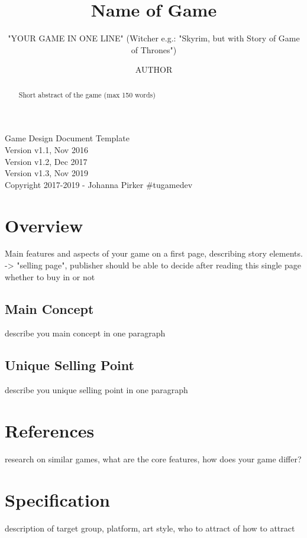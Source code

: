 \documentclass[a4paper]{scrreprt}
\title{Name of Game}
\subtitle{"YOUR GAME IN ONE LINE" (Witcher e.g.: "Skyrim, but with Story of Game of Thrones")}
\author{AUTHOR}
\begin{document}
\maketitle

\null\vfill
\noindent
Game Design Document Template\\ 
Version v1.1, Nov 2016\\
Version v1.2, Dec 2017\\
Version v1.3, Nov 2019\\
Copyright 2017-2019 - Johanna Pirker \#tugamedev\\
\newpage

\begin{abstract}
Short abstract of the game (max 150 words) 
\end{abstract}

\tableofcontents

\chapter{Overview}

Main features and aspects of your game on a first page, describing story elements. -> "selling page", publisher should be able to decide after reading this single page whether to buy in or not 

\section{Main Concept}
describe you main concept in one paragraph

\section{Unique Selling Point}
describe you unique selling point in one paragraph



\chapter{References} 
research on similar games, what are the core features, how does your game differ?


\chapter{Specification}
description of target group, platform, art style, who to attract of how to attract 
\end{document}
